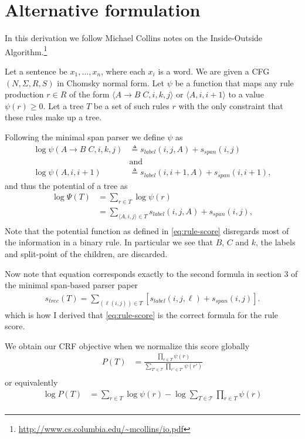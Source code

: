 \documentclass{article}
\begin{document}
\section{Alternative formulation}

In this derivation we follow Michael Collins notes on the Inside-Outside Algorithm.\footnote{\url{http://www.cs.columbia.edu/~mcollins/io.pdf}}

Let a sentence be $x_1,\dots,x_n$, where each $x_i$
is a word. We are given a CFG $(N, \Sigma, R, S)$ in Chomsky normal
form. Let $\psi$ be a function that maps any rule production $r \in R$ of the form $\langle A \to B \;C, i, k, j \rangle$ or $\langle A, i, i+1 \rangle$ to a value $\psi(r) \geq 0$. Let a tree $T$ be a set of such rules $r$ with the only constraint that these rules make up a tree.

Following the minimal span parser we define $\psi$ as
\begin{align}
\label{eq:rule-score}
    \log\psi(A \to B \;C, i, k, j) &\triangleq s_{label}(i, j, A) + s_{span}(i, j) \\
    &\text{and} \\
    \log\psi(A, i, i+1) &\triangleq s_{label}(i, i+1, A) + s_{span}(i, i+1),
\end{align}
and thus the potential of a tree as
\begin{align}
\label{eq:tree-score}
    \log\Psi(T) &= \sum_{r \in T} \log\psi(r) \\
        &= \sum_{\langle A, i, j \rangle \in T} s_{label}(i, j, A) + s_{span}(i, j), \\
\end{align}
Note that the potential function as defined in \ref{eq:rule-score} disregards most of the information in a binary rule. In particular we see that $B$, $C$ and $k$, the labels and split-point of the children, are discarded.

Now note that equation \label{eq:tree-score} corresponds exactly to the second formula in section 3 of the minimal span-based parser paper
\begin{align}
s_{tree}(T) = \sum_{(\ell(i,j))\in T}[s_{label}(i, j, \ell) + s_{span}(i, j)] .
\end{align}
which is how I derived that \ref{eq:rule-score} is the correct formula for the rule score.

We obtain our CRF objective when we normalize this score globally
\begin{align}
\label{eq:crf-objective}
    P(T) &= \frac{\prod_{r \in T} \psi(r)}{\sum_{T' \in \mathcal{T}} \prod_{r' \in T'} \psi(r')} \\
\end{align}
or equivalently
\begin{align}
\label{eq:logcrf-objective}
    \log P(T) &= \sum_{r \in T} \log \psi(r) - \log \sum_{T \in \mathcal{T}} \prod_{r \in T} \psi(r) \\
\end{align}
\end{document}
